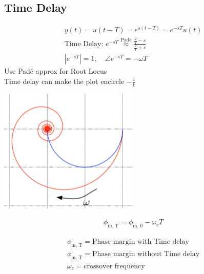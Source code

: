 \subsection{Time Delay}
    \begin{minipage}{0.63\linewidth}
        \begin{align*}
            y(t) = u(t-T) = e^{s(t-T)} = e^{-sT} u(t)\\
            \text{Time Delay: } e^{-sT} \overset{\text{Padé}}{\approx} \frac{\frac{2}{T} - s}{\frac{2}{T} + s}\\
            |e^{-sT}| = 1, \quad \angle e^{-sT} = - \omega T
        \end{align*}
        Use Padé approx for Root Locus\\
        Time delay can make the plot encircle $-\frac{1}{k}$
    \end{minipage}
    \begin{minipage}{0.35\linewidth}
        \includegraphics[width = \linewidth]{src/images/time_delay_nyquist.png}
    \end{minipage}
    \begin{minipage}{0.29\linewidth}
        \begin{align*}
            \phi_{\text{m, T}} = \phi_{\text{m, 0}} - \omega_c T
        \end{align*}
    \end{minipage}
    \begin{minipage}{0.69\linewidth}
        \begin{scriptsize}
            \begin{align*}
                \phi_{\text{m, T}} = \text{Phase margin with Time delay}\\
                \phi_{\text{m, T}} = \text{Phase margin without Time delay}\\
                \omega_c = \text{crossover frequency}
            \end{align*}
        \end{scriptsize}
    \end{minipage}